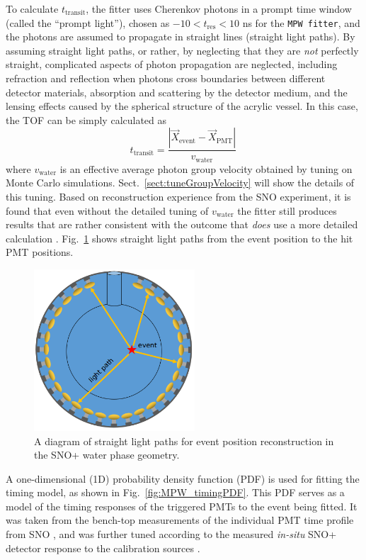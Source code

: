 To calculate $t_{\mathrm{transit}}$, the fitter uses Cherenkov photons in a prompt time window (called the ``prompt light''), chosen as $-10<t_{\mathrm{res}}<10$ ns for the \texttt{MPW fitter}, and the photons are assumed to propagate in straight lines (straight light paths). By assuming straight light paths, or rather, by neglecting that they are {\em not} perfectly straight, complicated aspects of photon propagation are neglected, including refraction and reflection when photons cross boundaries between different detector materials, absorption and scattering by the detector medium, and the lensing effects caused by the spherical structure of the acrylic vessel. In this case, the TOF can be simply calculated as 
\begin{equation*}
t_{\mathrm{transit}}=\frac{|\vec{X}_{\mathrm{event}}-\vec{X}_{\mathrm{PMT}}|}{v_{\mathrm{water}}} \, 
\end{equation*}
where $v_{\mathrm{water}}$ is an effective average photon group velocity obtained by tuning on Monte Carlo simulations. Sect.~\ref{sect:tuneGroupVelocity} will show the details of this tuning. Based on reconstruction experience from the SNO experiment, it is found that even without the detailed tuning of $v_{\mathrm{water}}$ the fitter still produces results that are rather consistent with the outcome that {\em does} use a more detailed calculation \cite{boulay2004direct,jones2011background}. Fig.~\ref{mpwdiagram_position} shows straight light paths from the event position to the hit PMT positions.
\begin{figure}[htbp]
	\centering
   \includegraphics[width=6cm]{mpwDiagram.png}
	\caption[Straight light path calculation in the water geometry.]{A diagram of straight light paths for event position reconstruction in the SNO+ water phase geometry.}
	\label{mpwdiagram_position}
\end{figure}

A one-dimensional (1D) probability density function (PDF) is used for fitting the timing model, as shown in Fig.~\ref{fig:MPW_timingPDF}. This PDF serves as a model of the timing responses of the triggered PMTs to the event being fitted. It was taken from the bench-top measurements of the individual PMT time profile from SNO \cite{jillings1996photomultiplier}, and was further tuned according to the measured \emph{in-situ} SNO+ detector response to the calibration sources \cite{anderson2021optical}.

